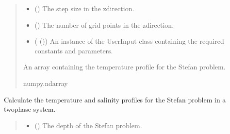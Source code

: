 \documentclass[a4paper,11pt,english,openany]{sphinxmanual}
\begin{document}
\begin{fulllineitems}
\begin{fulllineitems}
\begin{quote}
\begin{description}
\begin{itemize}
\item {} 
\sphinxAtStartPar
{} () \textendash{} The step size in the z\sphinxhyphen{}direction.

\item {} 
\sphinxAtStartPar
{} () \textendash{} The number of grid points in the z\sphinxhyphen{}direction.

\item {} 
\sphinxAtStartPar
{} ({\hyperref[\detokenize{api/spyice.parameters.user_input:spyice.parameters.user_input.UserInput}]{}} ()) \textendash{} An instance of the UserInput class containing the required constants and parameters.

\end{itemize}

\sphinxAtStartPar
An array containing the temperature profile for the Stefan problem.

\sphinxAtStartPar
numpy.ndarray

\end{description}\end{quote}

\end{fulllineitems}


\begin{fulllineitems}
\label{\detokenize{api/spyice.models.stefan_problem:spyice.models.stefan_problem.StefanProblem.calculate_temperature_twophase_profiles}}
\pysigstartsignatures
{}
\pysigstopsignatures
\sphinxAtStartPar
Calculate the temperature and salinity profiles for the Stefan problem in a two\sphinxhyphen{}phase system.
\begin{quote}\begin{description}
\begin{itemize}
\item {} 
\sphinxAtStartPar
{} () \textendash{} The depth of the Stefan problem.


\end{itemize}
\end{description}
\end{quote}
\end{fulllineitems}
\end{fulllineitems}
\end{document}
